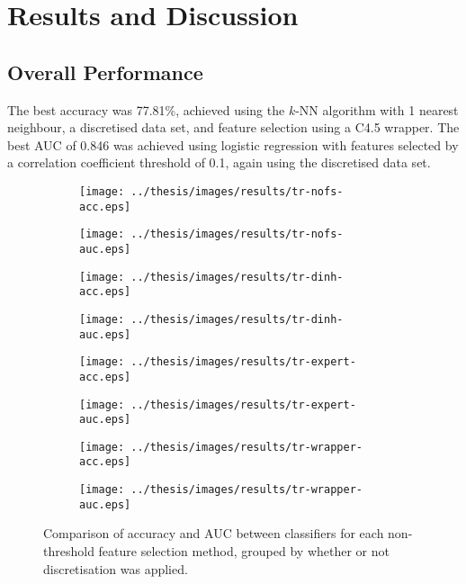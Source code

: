 \documentclass{article}
\begin{document}
\section{Results and Discussion}
\label{sec:results}

\subsection{Overall Performance}
The best accuracy was 77.81\%, achieved using the $k$-NN algorithm
with 1 nearest neighbour, a discretised data set, and feature selection using a
C4.5 wrapper. The best AUC of 0.846 was achieved using logistic regression with
features selected by a correlation coefficient threshold of 0.1, again
using the discretised data set.

\begin{figure*}[htbp]
\begin{subfigure}{.48\textwidth}
\texttt{[image: ../thesis/images/results/tr-nofs-acc.eps]}
\caption{}
\label{}
\end{subfigure}%
\begin{subfigure}{.55\textwidth}
\texttt{[image: ../thesis/images/results/tr-nofs-auc.eps]}
\caption{}
\label{}
\end{subfigure}

\begin{subfigure}{.48\textwidth}
\texttt{[image: ../thesis/images/results/tr-dinh-acc.eps]}
\caption{}
\label{}
\end{subfigure}%
\begin{subfigure}{.55\textwidth}
\texttt{[image: ../thesis/images/results/tr-dinh-auc.eps]}
\caption{}
\label{}
\end{subfigure}

\begin{subfigure}{.48\textwidth}
\texttt{[image: ../thesis/images/results/tr-expert-acc.eps]}
\caption{}
\label{}
\end{subfigure}%
\begin{subfigure}{.55\textwidth}
\texttt{[image: ../thesis/images/results/tr-expert-auc.eps]}
\caption{}
\label{}
\end{subfigure}

\begin{subfigure}{.48\textwidth}
\texttt{[image: ../thesis/images/results/tr-wrapper-acc.eps]}
\caption{}
\label{}
\end{subfigure}%
\begin{subfigure}{.55\textwidth}
\texttt{[image: ../thesis/images/results/tr-wrapper-auc.eps]}
\caption{}
\label{}
\end{subfigure}
\caption[]{Comparison of accuracy and AUC between classifiers for each non-threshold feature selection method, grouped by whether or not discretisation was applied.}
\label{}
\end{figure*}
\end{document}
